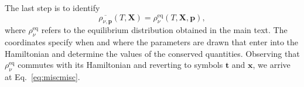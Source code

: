 \documentclass[aps,prd,twocolumn,groupedaddress]{revtex4-2}
\begin{document}
The last step is to identify
\begin{equation}
\overline{\rho_{\nu,\boldsymbol{p}}} (T, \boldsymbol{X}) = \rho_\nu^\textrm{eq} (T, \boldsymbol{X}, \boldsymbol{p}),
\end{equation}
where $\rho_\nu^\textrm{eq}$ refers to the equilibrium distribution obtained in the main text. The coordinates specify when and where the parameters are drawn that enter into the Hamiltonian and determine the values of the conserved quantities. Observing that $\rho_\nu^\textrm{eq}$ commutes with its Hamiltonian and reverting to symbols $\boldsymbol{t}$ and $\boldsymbol{x}$, we arrive at Eq.~\eqref{eq:miscmisc}.

















\end{document}
